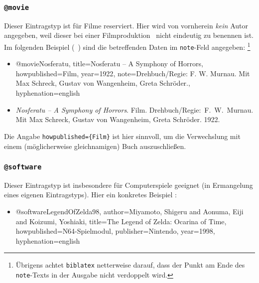 \subsubsection{\texttt{@movie}}
\label{sec:@movie}
Dieser Eintragstyp ist für Filme reserviert. 
Hier wird von vornherein \emph{kein} Autor angegeben, weil dieser bei 
einer Filmproduktion \ia\ nicht eindeutig zu benennen ist. 
Im folgenden Beispiel (\sa\ \cite{Psycho}) sind die betreffenden Daten 
im \texttt{note}-Feld angegeben:%
\footnote{Übrigens achtet \texttt{biblatex} netterweise darauf, dass der  
Punkt am Ende des \texttt{note}-Texts in der Ausgabe nicht verdoppelt wird.}
%
\begin{itemize}
\item[] 
\begin{GenericCode}[numbers=none]
@movie{Nosferatu,
    title={Nosferatu -- A Symphony of Horrors},
    howpublished={Film},
    year={1922},
    note={Drehbuch/Regie: F. W. Murnau. Mit Max Schreck, Gustav von Wangenheim, Greta Schröder.},
    hyphenation={english}
}
\end{GenericCode}
\item[\cite{Nosferatu}]
\textit{Nosferatu -- A Symphony of Horrors}. Film. 
Drehbuch/Regie:\ F.\ W.\ Murnau. 
Mit Max Schreck, Gustav von Wangenheim, Greta Schröder.
1922.
\end{itemize}
%
Die Angabe \verb!howpublished={Film}! ist hier sinnvoll, um die Verwechslung
mit einem (möglicherweise gleichnamigen) Buch auszuschließen.



\subsubsection{\texttt{@software}}
\label{sec:@software}
Dieser Eintragstyp ist insbesondere für Computerspiele geeignet (in Ermangelung
eines eigenen Eintragstyps). Hier ein konkretes Beispiel \cite{LegendOfZelda98}:
%
\begin{itemize}
\item[] 
\begin{GenericCode}[numbers=none]
@software{LegendOfZelda98,
   author={Miyamoto, Shigeru and Aonuma, Eiji and Koizumi, Yoshiaki},
   title={The Legend of Zelda: Ocarina of Time},
   howpublished={N64-Spielmodul},
   publisher={Nintendo},
   year={1998},
   hyphenation={english}
}
\end{GenericCode}
\end{itemize}



